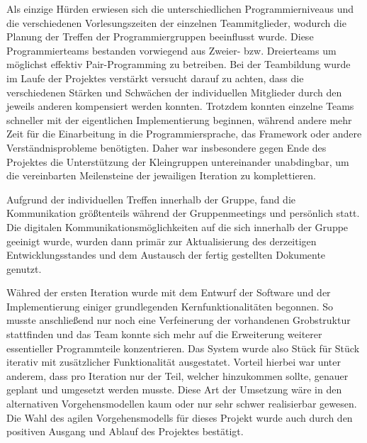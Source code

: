 Als einzige Hürden erwiesen sich die unterschiedlichen Programmierniveaus und die verschiedenen Vorlesungszeiten der einzelnen Teammitglieder, wodurch die Planung der Treffen der Programmiergruppen beeinflusst wurde.
Diese Programmierteams bestanden vorwiegend aus Zweier- bzw. Dreierteams um möglichst effektiv Pair-Programming zu betreiben. 
Bei der Teambildung wurde im Laufe der Projektes verstärkt versucht darauf zu achten, dass die verschiedenen Stärken und Schwächen der individuellen Mitglieder durch den jeweils anderen kompensiert werden konnten.
Trotzdem konnten einzelne Teams schneller mit der eigentlichen Implementierung beginnen, während andere mehr Zeit für die Einarbeitung in die Programmiersprache, das Framework oder andere Verständnisprobleme benötigten. 
Daher war insbesondere gegen Ende des Projektes die Unterstützung der Kleingruppen untereinander unabdingbar, um die vereinbarten Meilensteine der jewailigen Iteration zu komplettieren.

Aufgrund der individuellen Treffen innerhalb der Gruppe, fand die Kommunikation größtenteils während der Gruppenmeetings und persönlich statt.
Die digitalen Kommunikationsmöglichkeiten auf die sich innerhalb der Gruppe geeinigt wurde, wurden dann primär zur Aktualisierung des derzeitigen Entwicklungsstandes und dem Austausch der fertig gestellten Dokumente genutzt.

Währed der ersten Iteration wurde mit dem Entwurf der Software und der Implementierung einiger grundlegenden Kernfunktionalitäten begonnen. 
So musste anschließend nur noch eine Verfeinerung der vorhandenen Grobstruktur stattfinden und das Team konnte sich mehr auf die Erweiterung weiterer essentieller Programmteile konzentrieren. 
Das System  wurde also Stück für Stück iterativ mit zusätzlicher Funktionalität ausgestatet.
Vorteil hierbei war unter anderem, dass pro Iteration nur der Teil, welcher hinzukommen sollte, genauer geplant und umgesetzt werden musste. 
Diese Art der Umsetzung wäre in den alternativen Vorgehensmodellen kaum oder nur sehr schwer realisierbar gewesen.
Die Wahl des agilen Vorgehensmodells für dieses Projekt wurde auch durch den positiven Ausgang und Ablauf des Projektes bestätigt.